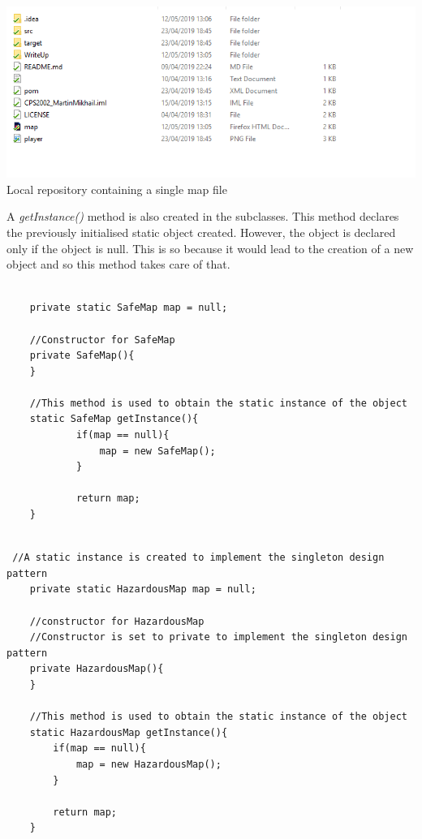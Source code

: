 \documentclass[a4paper,12pt]{extarticle}
\begin{document}
\begin{center}
\includegraphics[width=\textwidth]{Singleton1.png}\\
Local repository containing a single map file
\end{center}


\noindent A \textit{getInstance()} method is also created in the subclasses. This method declares the previously initialised static object created. However, the object is declared only if the object is null. This is so because it would lead to the creation of a new object and so this method takes care of that.\\

\newpage
\begin{lstlisting}

    private static SafeMap map = null;

    //Constructor for SafeMap
    private SafeMap(){
    }

    //This method is used to obtain the static instance of the object
    static SafeMap getInstance(){
            if(map == null){
                map = new SafeMap();
            }

            return map;
    }
    
\end{lstlisting}
\vspace{4mm}


\begin{lstlisting}
 //A static instance is created to implement the singleton design pattern
    private static HazardousMap map = null;

    //constructor for HazardousMap
    //Constructor is set to private to implement the singleton design pattern
    private HazardousMap(){
    }

    //This method is used to obtain the static instance of the object
    static HazardousMap getInstance(){
        if(map == null){
            map = new HazardousMap();
        }

        return map;
    }

\end{lstlisting}
\vspace{4mm}
\end{document}
